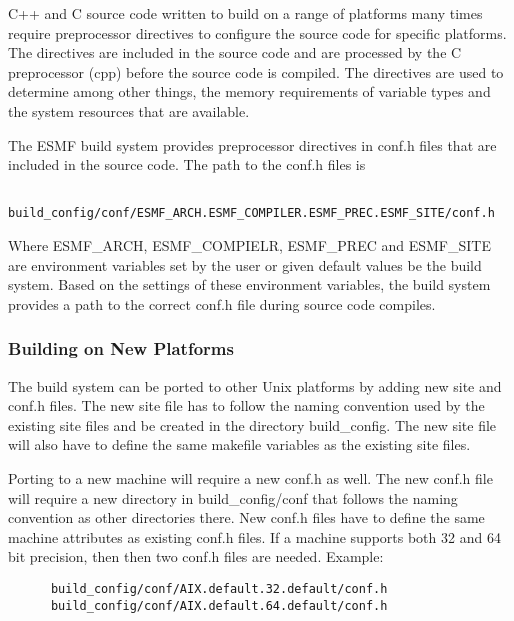 C++ and C source code written to build on a range of platforms many
times require preprocessor directives to configure the source code for
specific platforms.  The directives are included in the source code
and are processed by the C preprocessor (cpp) before the source code
is compiled.  The directives are used to determine among other things,
the memory requirements of variable types and the system resources
that are available.

The ESMF build system provides preprocessor directives in conf.h files
that are included in the source code.  The path to the conf.h files is

\begin{verbatim}
    build_config/conf/ESMF_ARCH.ESMF_COMPILER.ESMF_PREC.ESMF_SITE/conf.h
\end{verbatim}

Where ESMF\_ARCH, ESMF\_COMPIELR, ESMF\_PREC and ESMF\_SITE are
environment variables set by the user or given default values be the
build system.  Based on the settings of these environment variables,
the build system provides a path to the correct conf.h file during
source code compiles.

\subsubsection{Building on New Platforms}

The build system can be ported to other Unix platforms by adding new
site and conf.h files.  The new site file has to follow the naming
convention used by the existing site files and be created in the
directory build\_config.  The new site file will also have to define
the same makefile variables as the existing site files.

Porting to a new machine will require a new conf.h as well. The new
conf.h file will require a new directory in build\_config/conf that
follows the naming convention as other directories there.
New conf.h files have to define the same machine attributes as
existing conf.h files.  If a machine supports both 32 and 64 bit
precision, then then two conf.h files are needed.  Example:

\begin{verbatim}
      build_config/conf/AIX.default.32.default/conf.h
      build_config/conf/AIX.default.64.default/conf.h
\end{verbatim}

